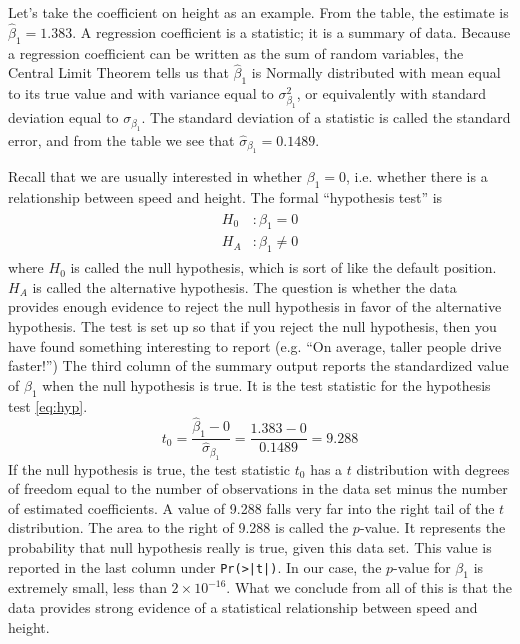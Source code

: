 Let's take the coefficient on height as an example. From the table,
the estimate is $\hat{\beta}_1 = 1.383$. A regression coefficient is a 
statistic; it is a summary of data. Because a regression coefficient
can be written as the sum of random variables, the Central Limit Theorem
tells us that $\hat{\beta}_1$ is Normally distributed with mean equal
to its true value and with variance equal to $\sigma^2_{\beta_1}$, or equivalently
with standard deviation equal to $\sigma_{\beta_1}$. The standard deviation
of a statistic is called the standard error, and from the table we see
that $\hat{\sigma}_{\beta_1} = 0.1489$.

Recall that we are usually interested in whether $\beta_1=0$,
i.e. whether there is a relationship between speed and height. The
formal ``hypothesis test'' is
\begin{align}
\begin{split}
  H_0 &: \beta_1 = 0 \\
  H_A &: \beta_1 \neq 0
\label{eq:hyp}
\end{split}
\end{align}
where $H_0$ is called the null hypothesis, which is sort of like the default
position. $H_A$ is called the alternative hypothesis. The question is whether
the data provides enough evidence to reject the null hypothesis in favor
of the alternative hypothesis. The test is set up so that if you reject
the null hypothesis, then you have found something interesting to report
(e.g. ``On average, taller people drive faster!'') The third column of the
summary output reports the standardized value of $\beta_1$ when the null
hypothesis is true. It is the test statistic for the hypothesis test
\ref{eq:hyp}.
\[ t_0 = \frac{\hat{\beta}_1 - 0}{\hat{\sigma}_{\beta_1}} =
  \frac{1.383 - 0}{0.1489} = 9.288 \] If the null hypothesis is true,
the test statistic $t_0$ has a $t$ distribution with degrees of
freedom equal to the number of observations in the data set minus the
number of estimated coefficients.  A value of 9.288 falls very far into
the right tail of the $t$ distribution.  The area to the right of
9.288 is called the $p$-value. It represents the probability that null
hypothesis really is true, given this data set. This value is reported
in the last column under \texttt{Pr(>|t|)}. In our case, the $p$-value
for $\beta_1$ is extremely small, less than $2 \times 10^{-16}$.  What
we conclude from all of this is that the data provides strong evidence
of a statistical relationship between speed and height.


